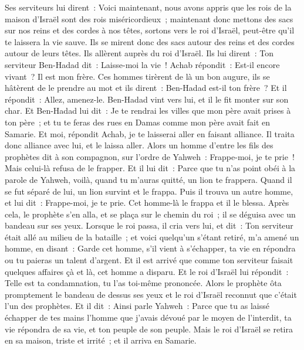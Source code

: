 \begin{multicols}{2}
Ses serviteurs lui dirent~: Voici maintenant, nous avons appris que les rois de la maison d'Israël sont des rois miséricordieux~; maintenant donc mettons des sacs sur nos reins et des cordes à nos têtes, sortons vers le roi d'Israël, peut-être qu'il te laissera la vie sauve.
Ils se mirent donc des sacs autour des reins et des cordes autour de leurs têtes. Ils allèrent auprès du roi d'Israël. Ils lui dirent~: Ton serviteur Ben-Hadad dit~: Laisse-moi la vie~! Achab répondit~: Est-il encore vivant~? Il est mon frère.
Ces hommes tirèrent de là un bon augure, ils se hâtèrent de le prendre au mot et ils dirent~: Ben-Hadad est-il ton frère~? Et il répondit~: Allez, amenez-le. Ben-Hadad vint vers lui, et il le fit monter sur son char.
Et Ben-Hadad lui dit~: Je te rendrai les villes que mon père avait prises à ton père~; et tu te feras des rues en Damas comme mon père avait fait en Samarie. Et moi, répondit Achab, je te laisserai aller en faisant alliance. Il traita donc alliance avec lui, et le laissa aller.
Alors un homme d'entre les fils des prophètes dit à son compagnon, sur l'ordre de Yahweh~: Frappe-moi, je te prie~! Mais celui-là refusa de le frapper.
Et il lui dit~: Parce que tu n'as point obéi à la parole de Yahweh, voilà, quand tu m'auras quitté, un lion te frappera. Quand il se fut séparé de lui, un lion survint et le frappa.
Puis il trouva un autre homme, et lui dit~: Frappe-moi, je te prie. Cet homme-là le frappa et il le blessa.
Après cela, le prophète s'en alla, et se plaça sur le chemin du roi~; il se déguisa avec un bandeau sur ses yeux.
Lorsque le roi passa, il cria vers lui, et dit~: Ton serviteur était allé au milieu de la bataille~; et voici quelqu'un s'étant retiré, m'a amené un homme, en disant~: Garde cet homme, s'il vient à s'échapper, ta vie en répondra ou tu paieras un talent d'argent.
Et il est arrivé que comme ton serviteur faisait quelques affaires çà et là, cet homme a disparu. Et le roi d'Israël lui répondit~: Telle est ta condamnation, tu l'as toi-même prononcée.
Alors le prophète ôta promptement le bandeau de dessus ses yeux et le roi d'Israël reconnut que c'était l'un des prophètes.
Et il dit~: Ainsi parle Yahweh~: Parce que tu as laissé échapper de tes mains l'homme que j'avais dévoué par le moyen de l'interdit, ta vie répondra de sa vie, et ton peuple de son peuple.
Mais le roi d'Israël se retira en sa maison, triste et irrité~; et il arriva en Samarie.

\end{multicols}
